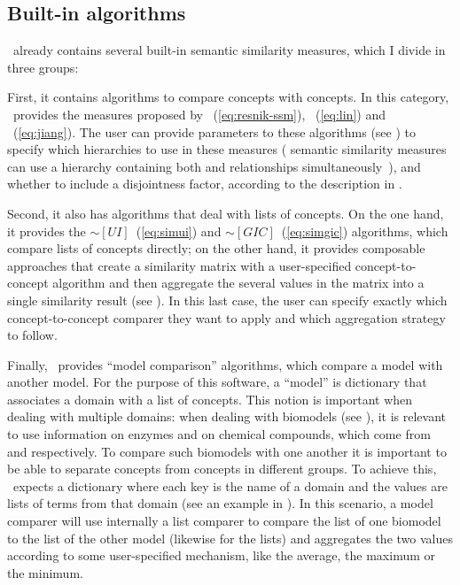 \subsection{Built-in algorithms} \label{sub:mossy/builtin}

\mossy\ already contains several built-in semantic similarity measures, which I divide in three groups:

First, it contains algorithms to compare concepts with concepts. In this category, \mossy\ provides the measures proposed by \citet{Resnik1995}~(\eqref{eq:resnik-ssm}), \citet{Lin1998}~(\eqref{eq:lin}) and \citet{Jiang1997}~(\eqref{eq:jiang}). The user can provide parameters to these algorithms (see ) to specify which hierarchies to use in these measures (\eg {} semantic similarity measures can use a hierarchy containing both  and  relationships simultaneously~\citep{Lord2003}), and whether to include a disjointness factor, according to the description in .

Second, it also has algorithms that deal with lists of concepts. On the one hand, it provides the $\sim[UI]$~(\eqref{eq:simui}) and $\sim[GIC]$~(\eqref{eq:simgic}) algorithms, which compare lists of concepts directly; on the other hand, it provides composable approaches that create a similarity matrix with a user-specified concept-to-concept algorithm and then aggregate the several values in the matrix into a single similarity result (see ). In this last case, the user can specify exactly which concept-to-concept comparer they want to apply and which aggregation strategy to follow.

Finally, \mossy\ provides ``model comparison'' algorithms, which compare a model with another model. For the purpose of this software, a ``model'' is dictionary that associates a domain with a list of concepts. This notion is important when dealing with multiple domains: \eg when dealing with biomodels (see ), it is relevant to use information on enzymes and on chemical compounds, which come from  and  respectively. To compare such biomodels with one another it is important to be able to separate  concepts from  concepts in different groups. To achieve this, \mossy\ expects a dictionary where each key is the name of a domain and the values are lists of terms from that domain (see an example in ). In this scenario, a model comparer will use internally a list comparer to compare the  list of one biomodel to the  list of the other model (likewise for the  lists) and aggregates the two values according to some user-specified mechanism, like the average, the maximum or the minimum.


